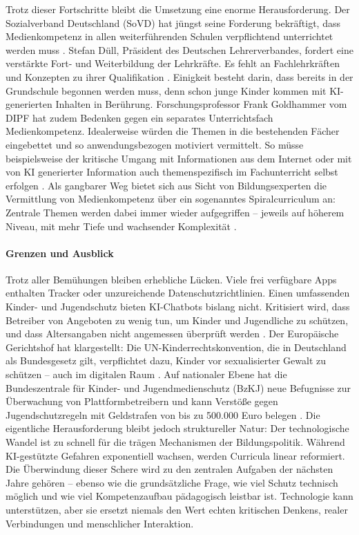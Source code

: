 \documentclass[12pt,a4paper]{article}
\begin{document}
	Trotz dieser Fortschritte bleibt die Umsetzung eine enorme Herausforderung. Der Sozialverband Deutschland (SoVD) hat jüngst seine Forderung bekräftigt, dass Medienkompetenz in allen weiterführenden Schulen verpflichtend unterrichtet werden muss \cite{SoVD2025}. Stefan Düll, Präsident des Deutschen Lehrerverbandes, fordert eine verstärkte Fort- und Weiterbildung der Lehrkräfte. Es fehlt an Fachlehrkräften und Konzepten zu ihrer Qualifikation \cite{DLV2025}. Einigkeit besteht darin, dass bereits in der Grundschule begonnen werden muss, denn schon junge Kinder kommen mit KI-generierten Inhalten in Berührung. Forschungsprofessor Frank Goldhammer vom DIPF hat zudem Bedenken gegen ein separates Unterrichtsfach Medienkompetenz. Idealerweise würden die Themen in die bestehenden Fächer eingebettet und so anwendungsbezogen motiviert vermittelt. So müsse beispielsweise der kritische Umgang mit Informationen aus dem Internet oder mit von KI generierter Information auch themenspezifisch im Fachunterricht selbst erfolgen \cite{DIPF2025}. Als gangbarer Weg bietet sich aus Sicht von Bildungsexperten die Vermittlung von Medienkompetenz über ein sogenanntes Spiralcurriculum an: Zentrale Themen werden dabei immer wieder aufgegriffen – jeweils auf höherem Niveau, mit mehr Tiefe und wachsender Komplexität \cite{Spiralcurriculum2025}.
	
	\paragraph{Grenzen und Ausblick}
	Trotz aller Bemühungen bleiben erhebliche Lücken. Viele frei verfügbare Apps enthalten Tracker oder unzureichende Datenschutzrichtlinien. Einen umfassenden Kinder- und Jugendschutz bieten KI-Chatbots bislang nicht. Kritisiert wird, dass Betreiber von Angeboten zu wenig tun, um Kinder und Jugendliche zu schützen, und dass Altersangaben nicht angemessen überprüft werden \cite{BzKJ2025b}. Der Europäische Gerichtshof hat klargestellt: Die UN-Kinderrechtskonvention, die in Deutschland als Bundesgesetz gilt, verpflichtet dazu, Kinder vor sexualisierter Gewalt zu schützen – auch im digitalen Raum \cite{EuGH2025}. Auf nationaler Ebene hat die Bundeszentrale für Kinder- und Jugendmedienschutz (BzKJ) neue Befugnisse zur Überwachung von Plattformbetreibern und kann Verstöße gegen Jugendschutzregeln mit Geldstrafen von bis zu 500.000 Euro belegen \cite{BzKJ2025a}. Die eigentliche Herausforderung bleibt jedoch struktureller Natur: Der technologische Wandel ist zu schnell für die trägen Mechanismen der Bildungspolitik. Während KI-gestützte Gefahren exponentiell wachsen, werden Curricula linear reformiert. Die Überwindung dieser Schere wird zu den zentralen Aufgaben der nächsten Jahre gehören – ebenso wie die grundsätzliche Frage, wie viel Schutz technisch möglich und wie viel Kompetenzaufbau pädagogisch leistbar ist. Technologie kann unterstützen, aber sie ersetzt niemals den Wert echten kritischen Denkens, realer Verbindungen und menschlicher Interaktion.
	
\end{document}
